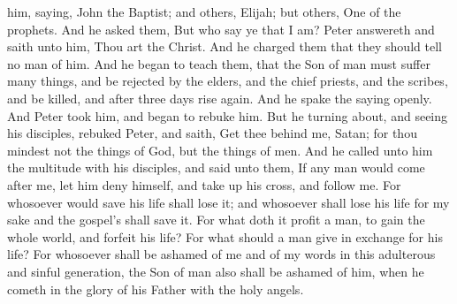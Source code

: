 him, saying, John the Baptist; and others, Elijah; but others, One of the prophets. And he asked them, But who say ye that I am? Peter answereth and saith unto him, Thou art the Christ. And he charged them that they should tell no man of him.  And he began to teach them, that the Son of man must suffer many things, and be rejected by the elders, and the chief priests, and the scribes, and be killed, and after three days rise again. And he spake the saying openly. And Peter took him, and began to rebuke him. But he turning about, and seeing his disciples, rebuked Peter, and saith, Get thee behind me, Satan; for thou mindest not the things of God, but the things of men. And he called unto him the multitude with his disciples, and said unto them, If any man would come after me, let him deny himself, and take up his cross, and follow me. For whosoever would save his life shall lose it; and whosoever shall lose his life for my sake and the gospel’s shall save it. For what doth it profit a man, to gain the whole world, and forfeit his life? For what should a man give in exchange for his life? For whosoever shall be ashamed of me and of my words in this adulterous and sinful generation, the Son of man also shall be ashamed of him, when he cometh in the glory of his Father with the holy angels. 

